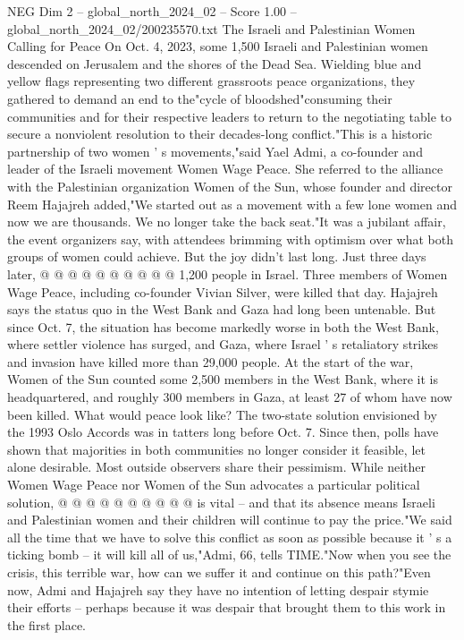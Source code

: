 \begin{textsample}{NEG Dim 2 – global\_north\_2024\_02 – Score 1.00 – global\_north\_2024\_02/200235570.txt}  \label{ex:f2_neg_304}
The Israeli and Palestinian Women Calling for Peace On Oct. 4, 2023, some 1,500 Israeli and Palestinian women descended on Jerusalem and the shores of the Dead Sea.
Wielding blue and yellow flags representing two different grassroots peace organizations, they gathered to demand an end to the"cycle of bloodshed"consuming their communities and for their respective leaders to return to the negotiating table to secure a nonviolent resolution to their decades-long conflict."This is a historic partnership of two women ' s movements,"said Yael Admi, a co-founder and leader of the Israeli movement Women Wage Peace.
She referred to the alliance with the Palestinian organization Women of the Sun, whose founder and director Reem Hajajreh added,"We started out as a movement with a few lone women and now we are thousands.
We no longer take the back seat."It was a jubilant affair, the event organizers say, with attendees brimming with optimism over what both groups of women could achieve.
But the joy didn't last long.
Just three days later, @ @ @ @ @ @ @ @ @ @ 1,200 people in Israel.
Three members of Women Wage Peace, including co-founder Vivian Silver, were killed that day.
Hajajreh says the status quo in the West Bank and Gaza had long been untenable.
But since Oct. 7, the situation has become markedly worse in both the West Bank, where settler violence has surged, and Gaza, where Israel ' s retaliatory strikes and invasion have killed more than 29,000 people.
At the start of the war, Women of the Sun counted some 2,500 members in the West Bank, where it is headquartered, and roughly 300 members in Gaza, at least 27 of whom have now been killed.
What would peace look like?
The two-state solution envisioned by the 1993 Oslo Accords was in tatters long before Oct. 7.
Since then, polls have shown that majorities in both communities no longer consider it feasible, let alone desirable.
Most outside observers share their pessimism.
While neither Women Wage Peace nor Women of the Sun advocates a particular political solution, @ @ @ @ @ @ @ @ @ @ is vital -- and that its absence means Israeli and Palestinian women and their children will continue to pay the price."We said all the time that we have to solve this conflict as soon as possible because it ' s a ticking bomb -- it will kill all of us,"Admi, 66, tells TIME."Now when you see the crisis, this terrible war, how can we suffer it and continue on this path?"Even now, Admi and Hajajreh say they have no intention of letting despair stymie their efforts -- perhaps because it was despair that brought them to this work in the first place.

\end{textsample}
